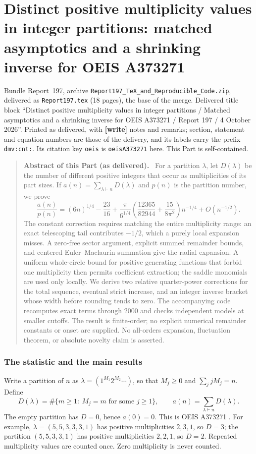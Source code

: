 \documentclass[11pt,letterpaper]{article}
\numberwithin{equation}{section}
\theoremstyle{definition}\newtheorem{definition}[theorem]{Definition}
\theoremstyle{remark}\newtheorem{remark}[theorem]{Remark}
\newcommand{\file}[1]{\nolinkurl{#1}}
\newenvironment{partabstract}{\begin{quote}\small\noindent\textbf{Abstract of this Part (as delivered).}\ }{\end{quote}}
\newcommand{\partsource}[1]{\par\noindent\begin{minipage}{\textwidth}\small #1\end{minipage}\par\medskip}
\begin{document}
\part{Distinct positive multiplicity values in integer partitions: matched asymptotics and a shrinking inverse for OEIS A373271}\label{dmv:cnt:part}
\partsource{Bundle Report~197, archive \file{Report197_TeX_and_Reproducible_Code.zip}, delivered as \file{Report197.tex} (18 pages), the base of the merge. Delivered title block ``Distinct positive multiplicity values in integer partitions / Matched asymptotics and a shrinking inverse for OEIS A373271 / Report 197 / 4 October 2026''. Printed as delivered, with \textbf{[write]} notes and remarks; section, statement and equation numbers are those of the delivery, and its labels carry the prefix \file{dmv:cnt:}. Its citation key \file{oeis} is \file{oeisA373271} here. This Part is self-contained.}
\begin{partabstract}
For a partition $\lambda$, let $D(\lambda)$ be the number of different positive integers that occur as multiplicities of its part sizes. If $a(n)=\sum_{\lambda\vdash n}D(\lambda)$ and $p(n)$ is the partition number, we prove
\[
\frac{a(n)}{p(n)}=(6n)^{1/4}-\frac{23}{16}
+\frac{\pi}{6^{1/4}}\left(\frac{12365}{82944}+\frac{15}{8\pi^2}\right)n^{-1/4}
+O(n^{-1/2}).
\]
The constant correction requires matching the entire multiplicity range: an exact telescoping tail contributes $-1/2$, which a purely local expansion misses. A zero-free sector argument, explicit summed remainder bounds, and centered Euler--Maclaurin summation give the radial expansion. A uniform whole-circle bound for positive generating functions that forbid one multiplicity then permits coefficient extraction; the saddle monomials are used only locally. We derive two relative quarter-power corrections for the total sequence, eventual strict increase, and an integer inverse bracket whose width before rounding tends to zero. The accompanying code recomputes exact terms through $2000$ and checks independent models at smaller cutoffs. The result is finite-order; no explicit numerical remainder constants or onset are supplied. No all-orders expansion, fluctuation theorem, or absolute novelty claim is asserted.
\end{partabstract}

\section{The statistic and the main results}\label{dmv:cnt:sec:main}
Write a partition of $n$ as $\lambda=(1^{M_1}2^{M_2}\cdots)$, so that $M_j\ge0$ and $\sum_jjM_j=n$. Define
\begin{equation}\label{dmv:cnt:eq:def}
D(\lambda)=\#\{m\ge1:\ M_j=m\text{ for some }j\ge1\},\qquad
 a(n)=\sum_{\lambda\vdash n}D(\lambda).
\end{equation}
The empty partition has $D=0$, hence $a(0)=0$. This is OEIS A373271 \cite{oeisA373271}. For example, $\lambda=(5,5,3,3,3,1)$ has positive multiplicities $2,3,1$, so $D=3$; the partition $(5,5,3,3,1)$ has positive multiplicities $2,2,1$, so $D=2$. Repeated multiplicity values are counted once. Zero multiplicity is never counted.
\end{document}
